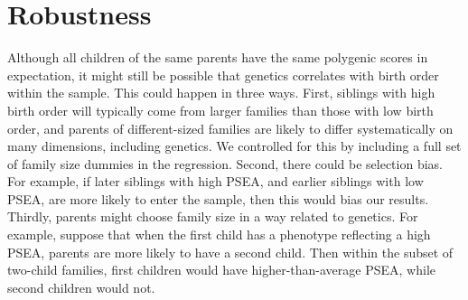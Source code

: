 \documentclass[
  12pt,
]{article}
\theoremstyle{definition}
\theoremstyle{definition}
\theoremstyle{definition}
\theoremstyle{definition}
\theoremstyle{remark}
\begin{document}
\FloatBarrier

\hypertarget{robustness}{%
\section{Robustness}\label{robustness}}

Although all children of the same parents have the same polygenic scores
in expectation, it might still be possible that genetics correlates with
birth order within the sample. This could happen in three ways. First,
siblings with high birth order will typically come from larger families
than those with low birth order, and parents of different-sized families
are likely to differ systematically on many dimensions, including
genetics. We controlled for this by including a full set of family size
dummies in the regression. Second, there could be selection bias. For
example, if later siblings with high PSEA, and earlier siblings with low
PSEA, are more likely to enter the sample, then this would bias our
results. Thirdly, parents might choose family size in a way related to
genetics. For example, suppose that when the first child has a phenotype
reflecting a high PSEA, parents are more likely to have a second child.
Then within the subset of two-child families, first children would have
higher-than-average PSEA, while second children would not.
\end{document}
